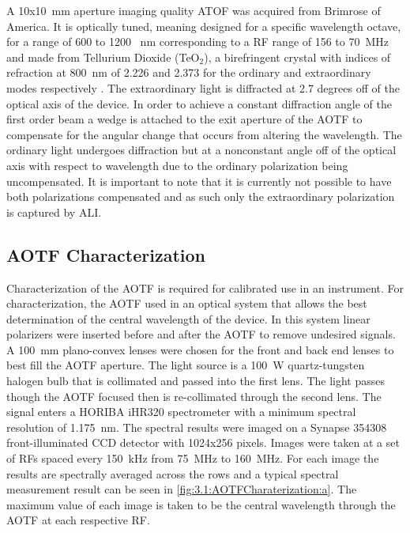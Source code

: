 \documentclass[12pt]{article}
\begin{document}
A 10x10~mm aperture imaging quality ATOF was acquired from Brimrose of America. It is optically tuned, meaning designed for a specific wavelength octave, for a range of 600 to 1200~ nm corresponding to a RF range of 156 to 70~MHz and made from Tellurium Dioxide (TeO$_{2}$), a birefringent crystal with indices of refraction at 800~nm of 2.226 and 2.373 for the ordinary and extraordinary modes respectively \citep{Uchida1971}. The extraordinary light is diffracted at 2.7 degrees off of the optical axis of the device. In order to achieve a constant diffraction angle of the first order beam a wedge is attached to the exit aperture of the AOTF to compensate for the angular change that occurs from altering the wavelength. The ordinary light undergoes diffraction but at a nonconstant angle off of the optical axis with respect to wavelength due to the ordinary polarization being uncompensated. It is important to note that it is currently not possible to have both polarizations compensated and as such only the extraordinary polarization is captured by ALI.

\subsection{AOTF Characterization}

Characterization of the AOTF is required for calibrated use in an instrument. For characterization, the AOTF used in an optical system that allows the best determination of the central wavelength of the device. In this system linear polarizers were inserted before and after the AOTF to remove undesired signals. A 100~mm plano-convex lenses were chosen for the front and back end lenses to best fill the AOTF aperture. The light source is a 100~W quartz-tungsten halogen bulb that is collimated and passed into the first lens. The light passes though the AOTF focused then is re-collimated through the second lens. The signal enters a HORIBA iHR320 spectrometer with a minimum spectral resolution of 1.175~nm. The spectral results were imaged on a Synapse 354308 front-illuminated CCD detector with 1024x256 pixels. Images were taken at a set of RFs spaced every 150~kHz from 75~MHz to 160~MHz. For each image the results are spectrally averaged across the rows and a typical spectral measurement result can be seen in \autoref{fig:3.1:AOTFCharaterization:a}. The maximum value of each image is taken to be the central wavelength through the AOTF at each respective RF.
\end{document}
